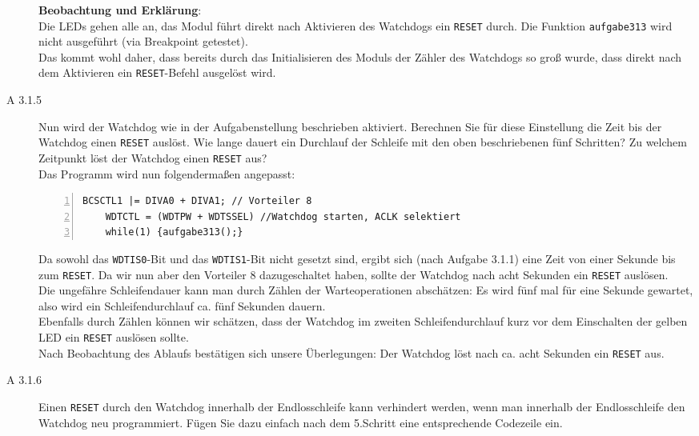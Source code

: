 \documentclass[11pt,a4paper,ngerman]{article}
\begin{document}
\begin{description}
	\textbf{Beobachtung und Erklärung}: \\
Die LEDs gehen alle an, das Modul führt direkt nach Aktivieren des Watchdogs ein \texttt{RESET} durch. Die Funktion \texttt{aufgabe313} wird nicht ausgeführt (via Breakpoint getestet).\\
Das kommt wohl daher, dass bereits durch das Initialisieren des Moduls der Zähler des Watchdogs so groß wurde, dass direkt nach dem Aktivieren ein \texttt{RESET}-Befehl ausgelöst wird.
	
	\item[A 3.1.5] Nun wird der Watchdog wie in der Aufgabenstellung beschrieben aktiviert. Berechnen Sie für diese Einstellung die Zeit bis der Watchdog einen \texttt{RESET} auslöst. Wie lange dauert ein Durchlauf der Schleife mit den oben beschriebenen fünf Schritten? Zu welchem Zeitpunkt löst der Watchdog einen \texttt{RESET} aus? \\
	
	Das Programm wird nun folgendermaßen angepasst:
	
	\begin{lstlisting}[numbers=left]
	BCSCTL1 |= DIVA0 + DIVA1; // Vorteiler 8
	WDTCTL = (WDTPW + WDTSSEL) //Watchdog starten, ACLK selektiert
	while(1) {aufgabe313();}
	\end{lstlisting}
	
	Da sowohl das \texttt{WDTIS0}-Bit und das  \texttt{WDTIS1}-Bit nicht gesetzt sind, ergibt sich (nach Aufgabe 3.1.1) eine Zeit von einer Sekunde bis zum \texttt{RESET}. Da wir nun aber den Vorteiler 8 dazugeschaltet haben, sollte der Watchdog nach acht Sekunden ein \texttt{RESET} auslösen. \\
	Die ungefähre Schleifendauer kann man durch Zählen der Warteoperationen abschätzen: Es wird fünf mal für eine Sekunde gewartet, also wird ein Schleifendurchlauf ca. fünf Sekunden dauern. \\
	Ebenfalls durch Zählen können wir schätzen, dass der Watchdog im zweiten Schleifendurchlauf kurz vor dem Einschalten der gelben LED ein \texttt{RESET} auslösen sollte.\\
	Nach Beobachtung des Ablaufs bestätigen sich unsere Überlegungen: Der Watchdog löst nach ca. acht Sekunden ein \texttt{RESET} aus.
	
	
	\item[A 3.1.6] Einen \texttt{RESET} durch den Watchdog innerhalb der Endlosschleife kann verhindert werden, wenn man innerhalb der Endlosschleife den Watchdog neu programmiert. Fügen Sie dazu einfach nach dem 5.Schritt eine entsprechende Codezeile ein. \\
	

\end{description}
\end{document}
